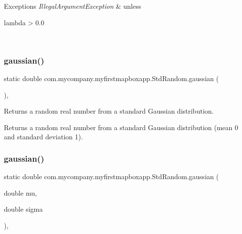 \begin{DoxyExceptions}{Exceptions}
{\em Illegal\+Argument\+Exception} & unless
\begin{DoxyCode}
lambda > 0.0 
\end{DoxyCode}
 \\
\hline
\end{DoxyExceptions}
\mbox{\label{classcom_1_1mycompany_1_1myfirstmapboxapp_1_1_std_random_ace5c3c0010e2e56808629057bcb888ba}} 
\subsubsection{\texorpdfstring{gaussian()}{gaussian()}\hspace{0.1cm}{\footnotesize\ttfamily [1/2]}}
{\footnotesize\ttfamily static double com.\+mycompany.\+myfirstmapboxapp.\+Std\+Random.\+gaussian (\begin{DoxyParamCaption}{ }\end{DoxyParamCaption})\hspace{0.3cm}{\ttfamily [inline]}, {\ttfamily [static]}}

Returns a random real number from a standard Gaussian distribution.

\begin{DoxyReturn}{Returns}
a random real number from a standard Gaussian distribution (mean 0 and standard deviation 1). 
\end{DoxyReturn}
\mbox{\label{classcom_1_1mycompany_1_1myfirstmapboxapp_1_1_std_random_a3a342ece7c596c34dd36e55ae858a5a1}} 
\subsubsection{\texorpdfstring{gaussian()}{gaussian()}\hspace{0.1cm}{\footnotesize\ttfamily [2/2]}}
{\footnotesize\ttfamily static double com.\+mycompany.\+myfirstmapboxapp.\+Std\+Random.\+gaussian (\begin{DoxyParamCaption}\item[{double}]{mu,  }\item[{double}]{sigma }\end{DoxyParamCaption})\hspace{0.3cm}{\ttfamily [inline]}, {\ttfamily [static]}}

